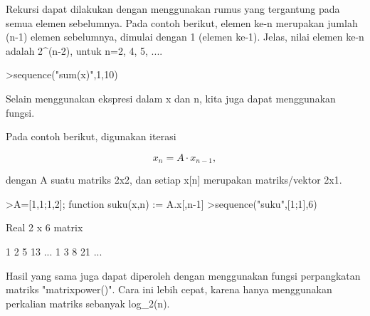 \documentclass[12pt,arial,letterpaper]{book}
\begin{document}
\begin{eulercomment}
\begin{eulercomment}
\begin{eulercomment}
\begin{eulercomment}
\begin{eulercomment}
\begin{eulercomment}
\begin{eulercomment}
\begin{eulercomment}
\begin{eulercomment}
\begin{eulercomment}
\begin{eulercomment}
\begin{eulercomment}
\begin{eulercomment}
\begin{eulercomment}
\begin{eulercomment}
\begin{eulercomment}
\begin{eulercomment}
\begin{eulercomment}
\begin{eulercomment}
\begin{eulercomment}
\begin{eulercomment}
\begin{eulercomment}
\begin{eulercomment}
Rekursi dapat dilakukan dengan menggunakan rumus yang tergantung pada
semua elemen sebelumnya. Pada contoh berikut, elemen ke-n merupakan
jumlah (n-1) elemen sebelumnya, dimulai dengan 1 (elemen ke-1). Jelas,
nilai elemen ke-n adalah 2\textasciicircum{}(n-2), untuk n=2, 4, 5, ....
\end{eulercomment}
\begin{eulerprompt}
>sequence("sum(x)",1,10)
\end{eulerprompt}
\begin{euleroutput}
  [1,  1,  2,  4,  8,  16,  32,  64,  128,  256]
\end{euleroutput}
\begin{eulercomment}
Selain menggunakan ekspresi dalam x dan n, kita juga dapat menggunakan
fungsi.

Pada contoh berikut, digunakan iterasi

\end{eulercomment}
\begin{eulerformula}
\[
x_n =A \cdot x_{n-1},
\]
\end{eulerformula}
\begin{eulercomment}
dengan A suatu matriks 2x2, dan setiap x[n] merupakan matriks/vektor
2x1.
\end{eulercomment}
\begin{eulerprompt}
>A=[1,1;1,2]; function suku(x,n) := A.x[,n-1]
>sequence("suku",[1;1],6)
\end{eulerprompt}
\begin{euleroutput}
  Real 2 x 6 matrix
  
              1             2             5            13     ...
              1             3             8            21     ...
\end{euleroutput}
\begin{eulercomment}
Hasil yang sama juga dapat diperoleh dengan menggunakan fungsi
perpangkatan matriks "matrixpower()". Cara ini lebih cepat, karena
hanya menggunakan perkalian matriks sebanyak log\_2(n).


\end{eulercomment}
\end{eulercomment}
\end{eulercomment}
\end{eulercomment}
\end{eulercomment}
\end{eulercomment}
\end{eulercomment}
\end{eulercomment}
\end{eulercomment}
\end{eulercomment}
\end{eulercomment}
\end{eulercomment}
\end{eulercomment}
\end{eulercomment}
\end{eulercomment}
\end{eulercomment}
\end{eulercomment}
\end{eulercomment}
\end{eulercomment}
\end{eulercomment}
\end{eulercomment}
\end{eulercomment}
\end{eulercomment}
\end{document}
